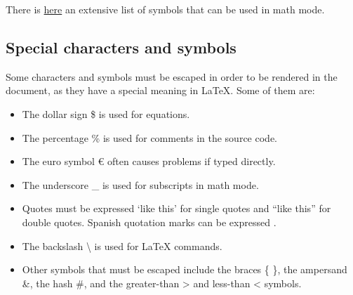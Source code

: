 There is \href{http://www.yann-ollivier.org/latex/texsymbols.pdf}{here} an extensive list of symbols that can be used in math mode.

\subsection{Special characters and symbols}
Some characters and symbols must be escaped in order to be rendered in the document, as they have a special meaning in LaTeX. Some of them are:

\begin{itemize}
     \item The dollar sign \$ is used for equations.
     \item The percentage \% is used for comments in the source code.
     \item The euro symbol \euro{} often causes problems if typed directly.
     \item The underscore \_ is used for subscripts in math mode.
     \item Quotes must be expressed `like this' for single quotes and ``like this'' for double quotes. Spanish quotation marks can be expressed .
     \item The backslash \textbackslash{} is used for LaTeX commands.
     \item Other symbols that must be escaped include the braces \{ \}, the ampersand \&, the hash \#, and the greater-than \textgreater{} and less-than \textless{} symbols.
\end{itemize}